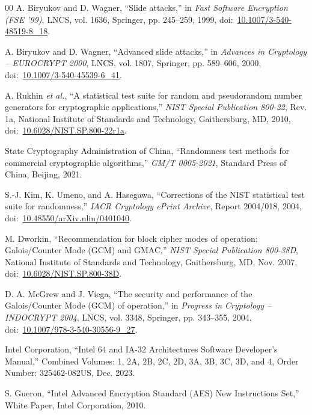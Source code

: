 \documentclass[10pt,twocolumn]{article}
\begin{document}
\begin{thebibliography}{00}
A. Biryukov and D. Wagner, ``Slide attacks,'' in \textit{Fast Software Encryption (FSE '99)}, LNCS, vol. 1636, Springer, pp. 245--259, 1999, doi:~\href{https://doi.org/10.1007/3-540-48519-8_18}{10.1007/3-540-48519-8\_18}.

A. Biryukov and D. Wagner, ``Advanced slide attacks,'' in \textit{Advances in Cryptology -- EUROCRYPT 2000}, LNCS, vol. 1807, Springer, pp. 589--606, 2000, doi:~\href{https://doi.org/10.1007/3-540-45539-6_41}{10.1007/3-540-45539-6\_41}.

A. Rukhin \textit{et al.}, ``A statistical test suite for random and pseudorandom number generators for cryptographic applications,'' \textit{NIST Special Publication 800-22}, Rev. 1a, National Institute of Standards and Technology, Gaithersburg, MD, 2010, doi:~\href{https://doi.org/10.6028/NIST.SP.800-22r1a}{10.6028/NIST.SP.800-22r1a}.

State Cryptography Administration of China, ``Randomness test methods for commercial cryptographic algorithms,'' \textit{GM/T 0005-2021}, Standard Press of China, Beijing, 2021.

S.-J. Kim, K. Umeno, and A. Hasegawa, ``Corrections of the NIST statistical test suite for randomness,'' \textit{IACR Cryptology ePrint Archive}, Report 2004/018, 2004, doi:~\href{https://doi.org/10.48550/arXiv.nlin/0401040}{10.48550/arXiv.nlin/0401040}.

M. Dworkin, ``Recommendation for block cipher modes of operation: Galois/Counter Mode (GCM) and GMAC,'' \textit{NIST Special Publication 800-38D}, National Institute of Standards and Technology, Gaithersburg, MD, Nov. 2007, doi:~\href{https://doi.org/10.6028/NIST.SP.800-38D}{10.6028/NIST.SP.800-38D}.

D. A. McGrew and J. Viega, ``The security and performance of the Galois/Counter Mode (GCM) of operation,'' in \textit{Progress in Cryptology -- INDOCRYPT 2004}, LNCS, vol. 3348, Springer, pp. 343--355, 2004, doi:~\href{https://doi.org/10.1007/978-3-540-30556-9_27}{10.1007/978-3-540-30556-9\_27}.

Intel Corporation, ``Intel 64 and IA-32 Architectures Software Developer's Manual,'' Combined Volumes: 1, 2A, 2B, 2C, 2D, 3A, 3B, 3C, 3D, and 4, Order Number: 325462-082US, Dec. 2023.

S. Gueron, ``Intel Advanced Encryption Standard (AES) New Instructions Set,'' White Paper, Intel Corporation, 2010.

\end{thebibliography}
\end{document}
